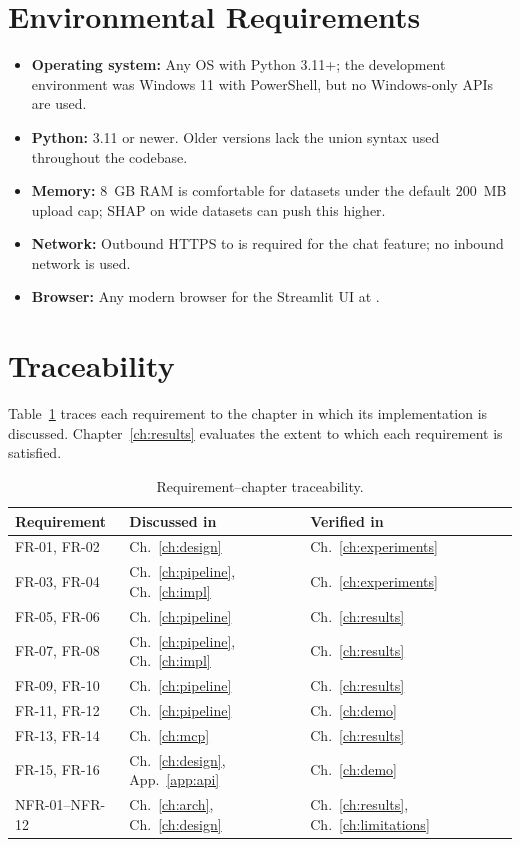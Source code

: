 \section{Environmental Requirements}
\label{sec:env-req}

\begin{itemize}[leftmargin=1.4em]
  \item \textbf{Operating system:} Any OS with Python 3.11+; the
        development environment was Windows 11 with PowerShell, but
        no Windows-only APIs are used.
  \item \textbf{Python:} 3.11 or newer. Older versions lack the
         union syntax used throughout the codebase.
  \item \textbf{Memory:} 8~GB RAM is comfortable for datasets under
        the default 200~MB upload cap; SHAP on wide datasets can push
        this higher.
  \item \textbf{Network:} Outbound HTTPS to  is
        required for the chat feature; no inbound network is used.
  \item \textbf{Browser:} Any modern browser for the Streamlit UI at
        .
\end{itemize}

\section{Traceability}
\label{sec:trace}

Table~\ref{tab:trace} traces each requirement to the chapter in which
its implementation is discussed. Chapter~\ref{ch:results} evaluates
the extent to which each requirement is satisfied.

\begin{table}[H]
\centering
\caption{Requirement--chapter traceability.}
\label{tab:trace}
\begin{tabular}{@{}lll@{}}
\toprule
\textbf{Requirement} & \textbf{Discussed in} & \textbf{Verified in} \\
\midrule
FR-01, FR-02 & Ch.~\ref{ch:design} & Ch.~\ref{ch:experiments} \\
FR-03, FR-04 & Ch.~\ref{ch:pipeline}, Ch.~\ref{ch:impl} & Ch.~\ref{ch:experiments} \\
FR-05, FR-06 & Ch.~\ref{ch:pipeline} & Ch.~\ref{ch:results} \\
FR-07, FR-08 & Ch.~\ref{ch:pipeline}, Ch.~\ref{ch:impl} & Ch.~\ref{ch:results} \\
FR-09, FR-10 & Ch.~\ref{ch:pipeline} & Ch.~\ref{ch:results} \\
FR-11, FR-12 & Ch.~\ref{ch:pipeline} & Ch.~\ref{ch:demo} \\
FR-13, FR-14 & Ch.~\ref{ch:mcp} & Ch.~\ref{ch:results} \\
FR-15, FR-16 & Ch.~\ref{ch:design}, App.~\ref{app:api} & Ch.~\ref{ch:demo} \\
NFR-01--NFR-12 & Ch.~\ref{ch:arch}, Ch.~\ref{ch:design} & Ch.~\ref{ch:results}, Ch.~\ref{ch:limitations} \\
\bottomrule
\end{tabular}
\end{table}
